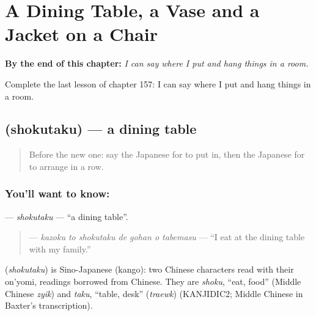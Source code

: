 
\chapter{A Dining Table, a Vase and a Jacket on a Chair}
\label{ch:ja-a-dining-table-a-vase-and-a-jacket-on-a-chair}

\begin{chapteropening}
\textbf{By the end of this chapter:} \emph{I can say where I put and hang things in a room.}

Complete the last lesson of chapter 157: I can say where I put and hang things in a room.
\end{chapteropening}

\section[\texorpdfstring{\ja{しょくたく} (shokutaku)}{しょくたく (shokutaku)}]{ (shokutaku) — a dining table}

\label{lesson:JA-C157-shokutaku}



\begin{quote}
Before the new one: say the Japanese for to put in, then the Japanese for to arrange in a row.
\end{quote}

\subsection*{You'll want to know: }
\textbf{} — \emph{shokutaku} — \textquotedblleft{}a dining table\textquotedblright{}.

\begin{quote}
\textbf{   } — \emph{kazoku to shokutaku de gohan o tabemasu} — \textquotedblleft{}I eat at the dining table with my family.\textquotedblright{}
\end{quote}

\begin{cousinweb}
\textbf{} (\emph{shokutaku}) is Sino-Japanese (kango): two Chinese characters read with their on'yomi, readings borrowed from Chinese. They are \emph{shoku}, \textquotedblleft{}eat, food\textquotedblright{} (Middle Chinese \emph{zyik}) and \emph{taku}, \textquotedblleft{}table, desk\textquotedblright{} (\emph{traewk}) (KANJIDIC2; Middle Chinese in Baxter's transcription).
\end{cousinweb}

